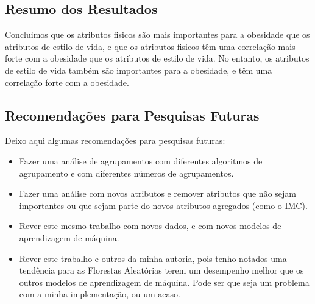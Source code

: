 \documentclass{easychair}
\begin{document}
\subsection{Resumo dos Resultados}

Concluimos que os atributos fisicos são mais importantes para a obesidade que os atributos de estilo de vida, e que os atributos fisicos têm uma correlação mais forte com a obesidade que os atributos de estilo de vida. No entanto, os atributos de estilo de vida também são importantes para a obesidade, e têm uma correlação forte com a obesidade.

\subsection{Recomendações para Pesquisas Futuras}

Deixo aqui algumas recomendações para pesquisas futuras:

\begin{itemize}
  \item Fazer uma análise de agrupamentos com diferentes algoritmos de agrupamento e com diferentes números de agrupamentos.
  \item Fazer uma análise com novos atributos e remover atributos que não sejam importantes ou que sejam parte do novos atributos agregados (como o IMC).
  \item Rever este mesmo trabalho com novos dados, e com novos modelos de aprendizagem de máquina.
  \item Rever este trabalho e outros da minha autoria, pois tenho notados uma tendência para as Florestas Aleatórias terem um desempenho melhor que os outros modelos de aprendizagem de máquina. Pode ser que seja um problema com a minha implementação, ou um acaso.
\end{itemize}



\end{document}
